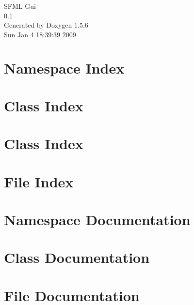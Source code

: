 \documentclass[a4paper]{book}
\begin{document}
\begin{titlepage}
\vspace*{7cm}
\begin{center}
{\Large SFML Gui \\[1ex]\large 0.1 }\\
\vspace*{1cm}
{\large Generated by Doxygen 1.5.6}\\
\vspace*{0.5cm}
{\small Sun Jan 4 18:39:39 2009}\\
\end{center}
\end{titlepage}
\clearemptydoublepage
{}
\tableofcontents
\clearemptydoublepage
{}
\chapter{Namespace Index}

\chapter{Class Index}

\chapter{Class Index}

\chapter{File Index}

\chapter{Namespace Documentation}

\chapter{Class Documentation}





\chapter{File Documentation}











\printindex
\end{document}
